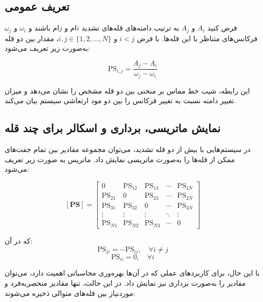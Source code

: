 \subsection{تعریف عمومی 
}

فرض کنید $A_i$ و $A_j$ به ترتیب دامنه‌های قله‌های تشدید $i$ام و $j$ام باشند و $\omega_i$ و $\omega_j$ فرکانس‌های متناظر با این قله‌ها. با فرض $i < j$ و $i, j \in \{1, 2, \ldots, N\}$، مقدار  بین دو قله به‌صورت زیر تعریف می‌شود:

\begin{equation}
\mathrm{PS}_{i,j} = \frac{A_j - A_i}{\omega_j - \omega_i}
\end{equation}

این رابطه، شیب خط مماس بر منحنی 
 بین دو قله مشخص را نشان می‌دهد و میزان تغییر دامنه نسبت به تغییر فرکانس را بین دو مود ارتعاشی سیستم بیان می‌کند.

\subsection{نمایش ماتریسی، برداری و اسکالر برای چند قله}

در سیستم‌هایی با بیش از دو قله تشدید، می‌توان مجموعه مقادیر  بین تمام جفت‌های ممکن از قله‌ها را به‌صورت ماتریسی نمایش داد. ماتریس  به صورت زیر تعریف می‌شود:

\begin{equation}
\left[\mathbf{PS}\right] = \begin{bmatrix}
0 & \mathrm{PS}_{12} & \mathrm{PS}_{13} & \cdots & \mathrm{PS}_{1N} \\
\mathrm{PS}_{21} & 0 & \mathrm{PS}_{23} & \cdots & \mathrm{PS}_{2N} \\
\mathrm{PS}_{31} & \mathrm{PS}_{32} & 0 & \cdots & \mathrm{PS}_{3N} \\
\vdots & \vdots & \vdots & \ddots & \vdots \\
\mathrm{PS}_{N1} & \mathrm{PS}_{N2} & \mathrm{PS}_{N3} & \cdots & 0
\end{bmatrix}
\end{equation}

که در آن:
\begin{equation}
\mathrm{PS}_{ji} = -\mathrm{PS}_{ij}, \quad \forall i \ne j
\end{equation}
\begin{equation}
\mathrm{PS}_{ii} = 0, \quad \forall i
\end{equation}

با این حال، برای کاربردهای عملی که در آن‌ها بهره‌وری محاسباتی اهمیت دارد، می‌توان مقادیر  را به‌صورت برداری نیز نمایش داد. در این حالت، تنها مقادیر منحصربه‌فرد و موردنیاز بین قله‌های متوالی ذخیره می‌شوند:

